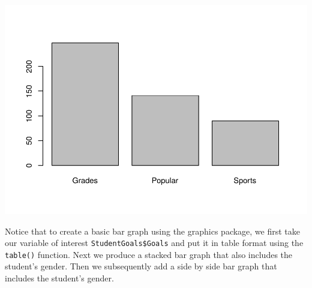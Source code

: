 \documentclass[
]{krantz}
\makeatletter
\newenvironment{Shaded}{\begin{snugshade}}{\end{snugshade}}
\newcommand{\DataTypeTok}[1]{\textcolor[rgb]{0.27,0.27,0.27}{#1}}
\newcommand{\DecValTok}[1]{\textcolor[rgb]{0.06,0.06,0.06}{#1}}
\newcommand{\KeywordTok}[1]{\textcolor[rgb]{0.27,0.27,0.27}{\textbf{#1}}}
\newcommand{\NormalTok}[1]{#1}
\newcommand{\OperatorTok}[1]{\textcolor[rgb]{0.43,0.43,0.43}{\textbf{#1}}}
\newcommand{\StringTok}[1]{\textcolor[rgb]{0.5,0.5,0.5}{#1}}
\newenvironment{kframe}{%
\medskip{}
\setlength{\fboxsep}{.8em}
 \def\at@end@of@kframe{}%
 \ifinner\ifhmode%
  \def\at@end@of@kframe{\end{minipage}}%
  \begin{minipage}{\columnwidth}%
 \fi\fi%
 \def\FrameCommand##1{\hskip\@totalleftmargin \hskip-\fboxsep
 \colorbox{shadecolor}{##1}\hskip-\fboxsep
     \hskip-\linewidth \hskip-\@totalleftmargin \hskip\columnwidth}%
 \MakeFramed {\advance\hsize-\width
   \@totalleftmargin\z@ \linewidth\hsize
   \@setminipage}}%
 {\par\unskip\endMakeFramed%
 \at@end@of@kframe}
\renewenvironment{Shaded}{\begin{kframe}}{\end{kframe}}
\makeatother
\begin{document}
\includegraphics{bookdown_files/figure-latex/unnamed-chunk-358-1.pdf}

Notice that to create a basic bar graph using the graphics package, we first take our variable of interest \texttt{StudentGoals\$Goals} and put it in table format using the \texttt{table()} function. Next we produce a stacked bar graph that also includes the student's gender. Then we subsequently add a side by side bar graph that includes the student's gender.

\begin{Shaded}
\end{Shaded}
\end{document}
